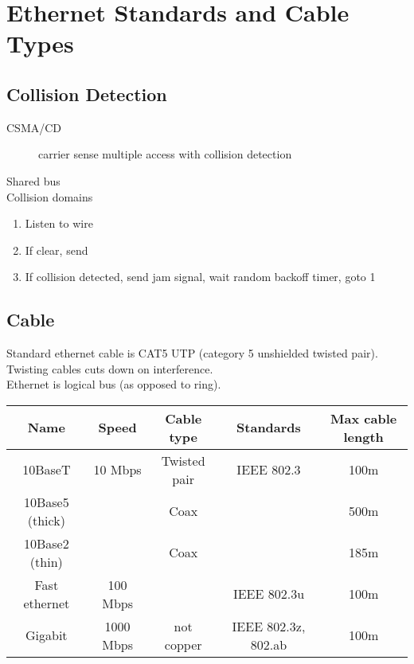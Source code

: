 \section{Ethernet Standards and Cable Types}

\subsection{Collision Detection}

\begin{description}

\item[CSMA/CD]
carrier sense multiple access with collision detection

\end{description}

Shared bus\\

Collision domains

\begin{enumerate}

\item Listen to wire
\item If clear, send
\item If collision detected, send jam signal, wait random backoff timer, goto 1

\end{enumerate}

\subsection{Cable}

Standard ethernet cable is CAT5 UTP (category 5 unshielded twisted pair).
Twisting cables cuts down on interference.\\

Ethernet is logical bus (as opposed to ring).\\

\begin{tabular}{ | c | c | c | c | c | }
\hline
Name & Speed & Cable type & Standards & Max cable length \\ \hline
10BaseT & 10 Mbps & Twisted pair & IEEE 802.3 & 100m \\ \hline
10Base5 (thick) & & Coax & & 500m \\ \hline
10Base2 (thin) & & Coax & & 185m \\ \hline
Fast ethernet & 100 Mbps & & IEEE 802.3u & 100m \\ \hline
Gigabit & 1000 Mbps & not copper & IEEE 802.3z, 802.ab & 100m \\ \hline
\end{tabular}

